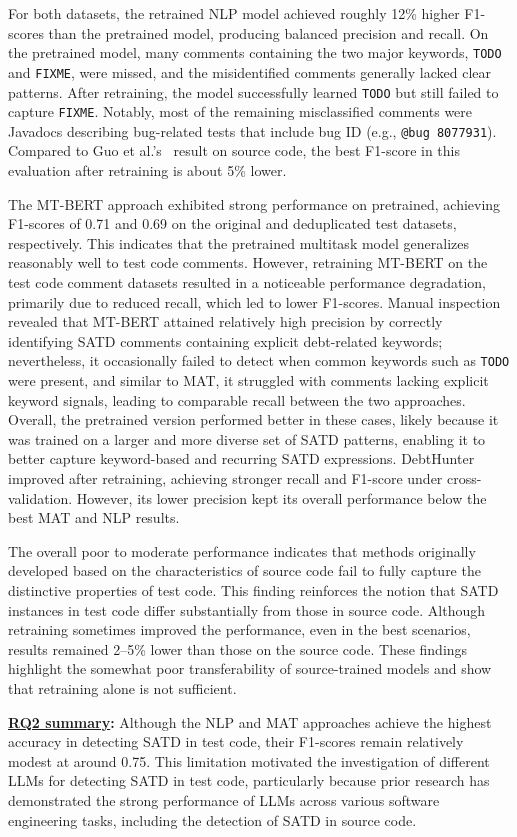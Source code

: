 For both datasets, the retrained NLP model achieved roughly 12\% higher F1-scores than the pretrained model, producing balanced precision and recall. On the pretrained model, many comments containing the two major keywords, \texttt{TODO} and \texttt{FIXME}, were missed, and the misidentified comments generally lacked clear patterns. After retraining, the model successfully learned \texttt{TODO} but still failed to capture \texttt{FIXME}. Notably, most of the remaining misclassified comments were Javadocs describing bug-related tests that include bug ID (e.g., \texttt{@bug 8077931}). Compared to Guo et al.’s~\cite{guo_how_2021} result on source code, the best F1-score in this evaluation after retraining is about 5\% lower.

The MT-BERT approach exhibited strong performance on pretrained, achieving F1-scores of 0.71 and 0.69 on the original and deduplicated test datasets, respectively. This indicates that the pretrained multitask model generalizes reasonably well to test code comments. However, retraining MT-BERT on the test code comment datasets resulted in a noticeable performance degradation, primarily due to reduced recall, which led to lower F1-scores. Manual inspection revealed that MT-BERT attained relatively high precision by correctly identifying SATD comments containing explicit debt-related keywords; nevertheless, it occasionally failed to detect when common keywords such as \texttt{TODO} were present, and similar to MAT, it struggled with comments lacking explicit keyword signals, leading to comparable recall between the two approaches. Overall, the pretrained version performed better in these cases, likely because it was trained on a larger and more diverse set of SATD patterns, enabling it to better capture keyword-based and recurring SATD expressions. DebtHunter improved after retraining, achieving stronger recall and F1-score under cross-validation. However, its lower precision kept its overall performance below the best MAT and NLP results.

The overall poor to moderate performance indicates that methods originally developed based on the characteristics of source code fail to fully capture the distinctive properties of test code. This finding reinforces the notion that SATD instances in test code differ substantially from those in source code. Although retraining sometimes improved the performance, even in the best scenarios, results remained 2–5\% lower than those on the source code. These findings highlight the somewhat poor transferability of source-trained models and show that retraining alone is not sufficient.

\begin{tcolorbox}
\noindent\textbf{\underline{RQ2 summary}:}
Although the NLP and MAT approaches achieve the highest accuracy in detecting SATD in test code, their F1-scores remain relatively modest at around 0.75. This limitation motivated the investigation of different LLMs for detecting SATD in test code, particularly because prior research has demonstrated the strong performance of LLMs across various software engineering tasks, including the detection of SATD in source code.
\end{tcolorbox}

